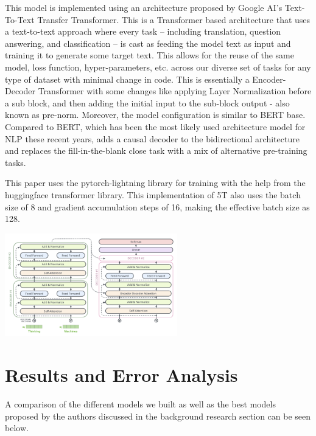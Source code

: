 \documentclass[11pt,a4paper]{article}
\begin{document}
This model is implemented using an architecture proposed by Google AI's Text-To-Text Transfer Transformer. This is a Transformer based architecture that uses a text-to-text approach where every task – including translation, question answering, and classification – is cast as feeding the model text as input and training it to generate some target text. This allows for the reuse of the same model, loss function, hyper-parameters, etc. across our diverse set of tasks for any type of dataset with minimal change in code. This is essentially a Encoder-Decoder Transformer with some changes like applying Layer Normalization before a sub block, and then adding the initial input to the sub-block output - also known as pre-norm. Moreover, the model configuration is similar to BERT base. Compared to BERT, which has been the most likely used architecture model for NLP these recent years, adds a causal decoder to the bidirectional architecture and replaces the fill-in-the-blank close task with a mix of alternative pre-training tasks.

This paper uses the pytorch-lightning library for training with the help from the huggingface transformer library. This implementation of 5T also uses the batch size of 8 and gradient accumulation steps of 16, making the effective batch size as 128. 



\includegraphics[width=75mm,scale=0.5]{T5_arch.png}


\section{Results and Error Analysis}

A comparison of the different models we built as well as the best models proposed by the authors discussed in the background research section can be seen below.
\end{document}
